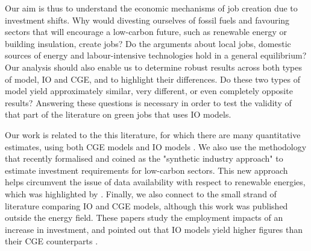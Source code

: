 Our aim is thus to understand the economic mechanisms of job creation due to investment shifts. Why would divesting ourselves of fossil fuels and favouring sectors that will encourage a low-carbon future, such as renewable energy or building insulation, create jobs? Do the arguments about local jobs, domestic sources of energy and labour-intensive technologies hold in a general equilibrium?
Our analysis should also enable us to determine robust results across both types of model, IO and CGE, and to highlight their differences. Do these two types of model yield approximately similar, very different, or even completely opposite results? Answering these questions is necessary in order to test the validity of that part of the literature on green jobs that uses IO models.

Our work is related to the this literature, for which there are many quantitative estimates, using both CGE models \citep{Lehr2008, Lehr2012, Bohringer2013, Blazejczak2014, Creutzig2014, Duscha2014, Duscha2016, Chen2016} and IO models \citep{Hillebrand2006, Scott2008, deArce2012, Markaki2013, Hartwig2016, Yushchenko2016, Li2016, Garrett2017}.
We also use the methodology that \citet{Garrett2017} recently formalised and coined as the "synthetic industry approach" to estimate investment requirements for low-carbon sectors. This new approach helps circumvent the issue of data availability with respect to renewable energies, which was highlighted by \citet{Cameron2015}.
Finally, we also connect to the small strand of literature comparing IO and CGE models, although this work was published outside the energy field. These papers study the employment impacts of an increase in investment, and pointed out that IO models yield higher figures than their CGE counterparts \citep{Partridge1998, OHara2013, Dwyer2005}.

